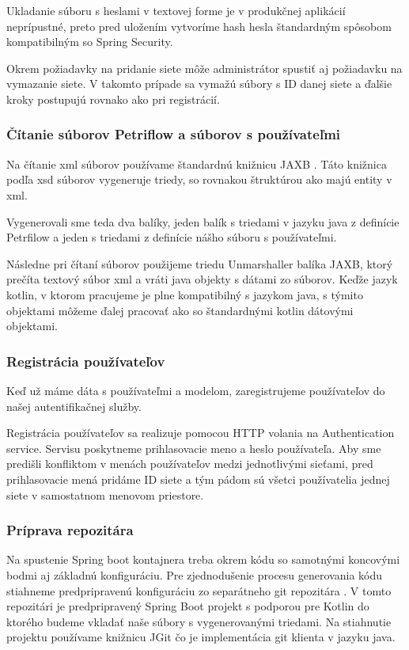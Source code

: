 Ukladanie súboru s heslami v textovej forme je v produkčnej aplikácií neprípustné, preto pred uložením vytvoríme hash hesla štandardným spôsobom kompatibilným so Spring Security. 



Okrem požiadavky na pridanie siete môže administrátor spustiť aj požiadavku na vymazanie siete. V takomto prípade sa vymažú súbory s ID danej siete a ďalšie kroky postupujú rovnako ako pri registrácií. 





\subsubsection{Čítanie súborov Petriflow a súborov s používateľmi} 
Na čítanie \acrshort{xml} súborov používame štandardnú knižnicu JAXB \cite{jaxb}. Táto knižnica podľa \acrshort{xsd} súborov vygeneruje triedy, so rovnakou štruktúrou ako majú entity v \acrshort{xml}. 

Vygenerovali sme teda dva balíky, jeden balík s triedami v jazyku java z definície Petrfilow a jeden s triedami z definície nášho súboru s používateľmi.  

Následne pri čítaní súborov použijeme triedu Unmarshaller balíka JAXB, ktorý prečíta textový súbor \acrshort{xml} a vráti java objekty s dátami zo súborov. Keďže jazyk kotlin, v ktorom pracujeme je plne kompatibilný s jazykom java, s týmito objektami môžeme ďalej pracovať ako so štandardnými kotlin dátovými objektami. 



\subsubsection{Registrácia používateľov} 
Keď už máme dáta s používateľmi a modelom, zaregistrujeme používateľov do našej autentifikačnej služby. 

Registrácia používateľov sa realizuje pomocou HTTP volania na Authentication service. Servisu poskytneme prihlasovacie meno a heslo používateľa. Aby sme predišli konfliktom v menách používateľov medzi jednotlivými sieťami, pred prihlasovacie mená pridáme ID siete a tým pádom sú všetci používatelia jednej siete v samostatnom menovom priestore. 



\subsubsection{Príprava repozitára} 
Na spustenie Spring boot kontajnera treba okrem kódu so samotnými koncovými bodmi aj základnú konfiguráciu. Pre zjednodušenie procesu generovania kódu stiahneme predpripravenú konfiguráciu zo separátneho git repozitára \cite{dp_relay}. V tomto repozitári je predpripravený Spring Boot projekt s podporou pre Kotlin do ktorého budeme vkladať naše súbory s vygenerovanými triedami. Na stiahnutie projektu používame knižnicu JGit \cite{jgit} čo je implementácia git klienta v jazyku java. 


